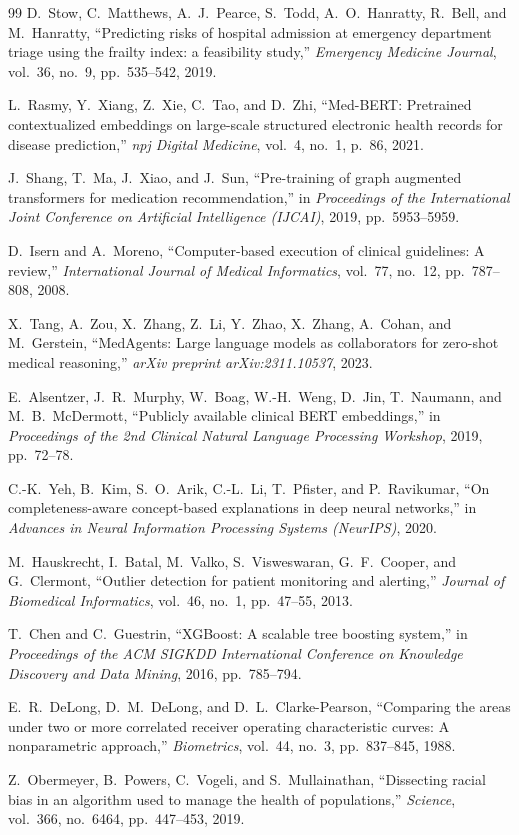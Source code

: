 \documentclass[review,12pt,authoryear]{elsarticle}
\begin{document}
\begin{thebibliography}{99}
D.~Stow, C.~Matthews, A.~J.~Pearce, S.~Todd, A.~O.~Hanratty, R.~Bell, and M.~Hanratty, ``Predicting risks of hospital admission at emergency department triage using the frailty index: a feasibility study,'' \textit{Emergency Medicine Journal}, vol.~36, no.~9, pp.~535--542, 2019.

L.~Rasmy, Y.~Xiang, Z.~Xie, C.~Tao, and D.~Zhi, ``Med-BERT: Pretrained contextualized embeddings on large-scale structured electronic health records for disease prediction,'' \textit{npj Digital Medicine}, vol.~4, no.~1, p.~86, 2021.

J.~Shang, T.~Ma, J.~Xiao, and J.~Sun, ``Pre-training of graph augmented transformers for medication recommendation,'' in \textit{Proceedings of the International Joint Conference on Artificial Intelligence (IJCAI)}, 2019, pp.~5953--5959.

D.~Isern and A.~Moreno, ``Computer-based execution of clinical guidelines: A review,'' \textit{International Journal of Medical Informatics}, vol.~77, no.~12, pp.~787--808, 2008.

X.~Tang, A.~Zou, X.~Zhang, Z.~Li, Y.~Zhao, X.~Zhang, A.~Cohan, and M.~Gerstein, ``MedAgents: Large language models as collaborators for zero-shot medical reasoning,'' \textit{arXiv preprint arXiv:2311.10537}, 2023.

E.~Alsentzer, J.~R.~Murphy, W.~Boag, W.-H.~Weng, D.~Jin, T.~Naumann, and M.~B.~McDermott, ``Publicly available clinical BERT embeddings,'' in \textit{Proceedings of the 2nd Clinical Natural Language Processing Workshop}, 2019, pp.~72--78.

C.-K.~Yeh, B.~Kim, S.~O.~Arik, C.-L.~Li, T.~Pfister, and P.~Ravikumar, ``On completeness-aware concept-based explanations in deep neural networks,'' in \textit{Advances in Neural Information Processing Systems (NeurIPS)}, 2020.

M.~Hauskrecht, I.~Batal, M.~Valko, S.~Visweswaran, G.~F.~Cooper, and G.~Clermont, ``Outlier detection for patient monitoring and alerting,'' \textit{Journal of Biomedical Informatics}, vol.~46, no.~1, pp.~47--55, 2013.

T.~Chen and C.~Guestrin, ``XGBoost: A scalable tree boosting system,'' in \textit{Proceedings of the ACM SIGKDD International Conference on Knowledge Discovery and Data Mining}, 2016, pp.~785--794.

E.~R.~DeLong, D.~M.~DeLong, and D.~L.~Clarke-Pearson, ``Comparing the areas under two or more correlated receiver operating characteristic curves: A nonparametric approach,'' \textit{Biometrics}, vol.~44, no.~3, pp.~837--845, 1988.

Z.~Obermeyer, B.~Powers, C.~Vogeli, and S.~Mullainathan, ``Dissecting racial bias in an algorithm used to manage the health of populations,'' \textit{Science}, vol.~366, no.~6464, pp.~447--453, 2019.

\end{thebibliography}
\end{document}
